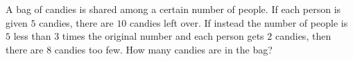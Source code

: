 A bag of candies is shared among a certain number of people. If each person is given $5$ candies, there are $10$ candies left over. If instead the number of people is $5$ less than $3$ times the original number and each person gets $2$ candies, then there are $8$ candies too few. How many candies are in the bag?
